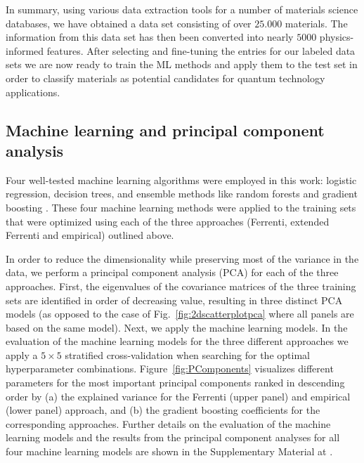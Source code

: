 \documentclass[superscriptaddress,unsortedaddress,
 amsmath,amssymb,
 aps,
]{revtex4-2}
\begin{document}
In summary, using various data extraction tools for a number of materials science databases, we have obtained a data set consisting of over $25.000$ materials. The information from this data set has then been converted into nearly $5000$ physics-informed features.  
After selecting and fine-tuning the entries for our labeled data sets we are now ready to train the ML methods and apply them to the test set in order to classify materials as potential candidates for quantum technology applications. 

\subsection*{Machine learning and principal component analysis}

Four well-tested machine learning algorithms were employed in this work: logistic regression, decision trees, and ensemble methods like random forests and gradient boosting \cite{Mehta2019,Hastie2009}. 
These four machine learning methods were applied to the training sets that were optimized using each of the three approaches (Ferrenti, extended Ferrenti and empirical) outlined above. %

In order to reduce the dimensionality while preserving most of the variance in the data,
we perform a principal component analysis (PCA) for each of the three approaches.
First, the eigenvalues of the covariance matrices of the three training sets are identified in order of decreasing value,  resulting in three distinct PCA models (as opposed to the case of Fig.~\ref{fig:2dscatterplotpca} where all panels are based on the same model). 
Next, we apply the machine learning models. 
% 
In the evaluation of the machine learning models for the three different approaches we apply a $5\times 5$ stratified cross-validation when searching for the optimal hyperparameter combinations. 
%
Figure~\ref{fig:PComponents} visualizes different parameters for the 
most important principal components ranked in descending order by (a) the explained variance for the Ferrenti (upper panel) and empirical (lower panel) approach, and (b) the gradient boosting coefficients for the corresponding approaches.  
Further details on the evaluation of the machine learning models and the results from the principal component analyses for all four machine learning models are shown in the Supplementary Material at \cite{supplementary}. 
\end{document}
